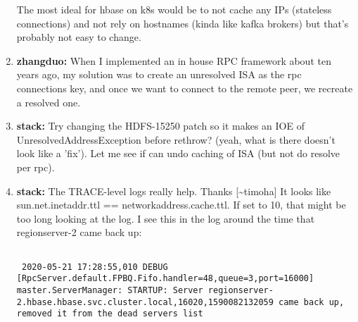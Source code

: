 \documentclass{report}%
\begin{document}
\begin{enumerate}
The most ideal for hbase on k8s would be to not cache any IPs (stateless connections) and not rely on hostnames (kinda like kafka brokers) but that's probably not easy to change.%
\item%
\textbf{zhangduo: }When I implemented an in house RPC framework about ten years ago, my solution was to create an unresolved ISA as the rpc connections key, and once we want to connect to the remote peer, we recreate a resolved one.%
\item%
\textbf{stack: }Try changing the HDFS{-}15250 patch so it makes an IOE of UnresolvedAddressException before rethrow? (yeah, what is there doesn't look like a 'fix').\newline%
\newline%
\newline%
\newline%
Let me see if can undo caching of ISA (but not do resolve per rpc).\newline%
\newline%
%
\item%
\textbf{stack: }The TRACE{-}level logs really help. Thanks {[}\textasciitilde{}timoha{]}\newline%
\newline%
\newline%
\newline%
It looks like sun.net.inetaddr.ttl ==  networkaddress.cache.ttl.\newline%
\newline%
\newline%
\newline%
If set to 10, that might be too long looking at the log.\newline%
\newline%
\newline%
\newline%
I see this in the log around the time that regionserver{-}2 came back up:\newline%
\newline%
\newline%
\newline%
\begin{lstlisting}

 2020-05-21 17:28:55,010 DEBUG [RpcServer.default.FPBQ.Fifo.handler=48,queue=3,port=16000] master.ServerManager: STARTUP: Server regionserver-2.hbase.hbase.svc.cluster.local,16020,1590082132059 came back up, removed it from the dead servers list


\end{lstlisting}
\end{enumerate}
\end{document}
